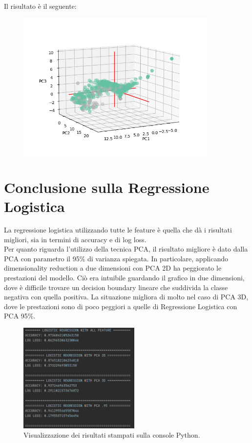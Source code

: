 Il risultato è il seguente:\\
\begin{figure}[h]
	\centering   	
	\includegraphics[width=100mm]{image/grafico3d.png}
\end{figure}

\section{Conclusione sulla Regressione Logistica}
La regressione logistica utilizzando tutte le feature è quella che dà i risultati migliori, sia in termini di accuracy e di log loss.\\
Per quanto riguarda l'utilizzo della tecnica PCA, il risultato migliore è dato dalla PCA con parametro il 95\% di varianza spiegata. In particolare, applicando dimensionality reduction a due dimensioni con PCA 2D ha peggiorato le prestazioni del modello. Ciò era intuibile guardando il grafico in due dimensioni, dove è difficile trovare un decision boundary lineare che suddivida la classe negativa con quella positiva. La situazione migliora di molto nel caso di PCA 3D, dove le prestazioni sono di poco peggiori a quelle di Regressione Logistica con PCA 95\%.
\begin{figure}[h]
	\centering   	
	\includegraphics[width=60mm]{image/regressionelogisticaresults.png}
	\caption{Visualizzazione dei risultati stampati sulla console Python.}
\end{figure}